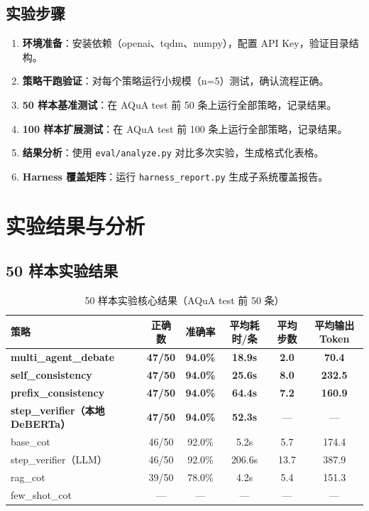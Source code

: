 \documentclass[lang=cn,a4paper,newtx]{elegantpaper}
\begin{document}
\subsection{实验步骤}

\begin{enumerate}
  \item \textbf{环境准备}：安装依赖（openai、tqdm、numpy），配置 API Key，验证目录结构。
  \item \textbf{策略干跑验证}：对每个策略运行小规模（n=5）测试，确认流程正确。
  \item \textbf{50 样本基准测试}：在 AQuA test 前 50 条上运行全部策略，记录结果。
  \item \textbf{100 样本扩展测试}：在 AQuA test 前 100 条上运行全部策略，记录结果。
  \item \textbf{结果分析}：使用 \texttt{eval/analyze.py} 对比多次实验，生成格式化表格。
  \item \textbf{Harness 覆盖矩阵}：运行 \texttt{harness\_report.py} 生成子系统覆盖报告。
\end{enumerate}

\section{实验结果与分析}

\subsection{50 样本实验结果}

\begin{table}[htbp]
\centering
\caption{50 样本实验核心结果（AQuA test 前 50 条）}
\begin{tabular}{lccccc}
\toprule
策略 & 正确数 & 准确率 & 平均耗时/条 & 平均步数 & 平均输出 Token \\
\midrule
\textbf{multi\_agent\_debate} & \textbf{47/50} & \textbf{94.0\%} & \textbf{18.9s} & \textbf{2.0} & \textbf{70.4} \\
\textbf{self\_consistency} & \textbf{47/50} & \textbf{94.0\%} & \textbf{25.6s} & \textbf{8.0} & \textbf{232.5} \\
\textbf{prefix\_consistency} & \textbf{47/50} & \textbf{94.0\%} & \textbf{64.4s} & \textbf{7.2} & \textbf{160.9} \\
\textbf{step\_verifier（本地 DeBERTa）} & \textbf{47/50} & \textbf{94.0\%} & \textbf{52.3s} & --- & --- \\
base\_cot & 46/50 & 92.0\% & 5.2s & 5.7 & 174.4 \\
step\_verifier（LLM） & 46/50 & 92.0\% & 206.6s & 13.7 & 387.9 \\
rag\_cot & 39/50 & 78.0\% & 4.2s & 5.4 & 151.3 \\
few\_shot\_cot & --- & --- & --- & --- & --- \\
\bottomrule
\end{tabular}
\end{table}
\end{document}
